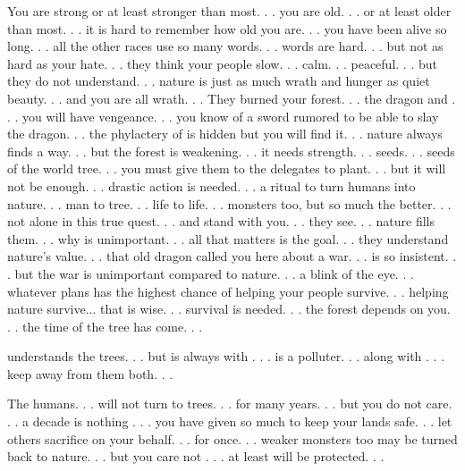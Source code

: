 \documentclass[char]{guildcamp2}
\begin{document}
\name{\cEnt{}}




You are strong or at least stronger than most. . . you are old. . . or at least older than most. . . it is hard to remember how old you are. . . you have been alive so long. . . all the other races use so many words. . . words are hard. . . but not as hard as your hate. . . they think your people slow. . . calm. . . peaceful. . . but they do not understand. . . nature is just as much wrath and hunger as quiet beauty. . . and you are all wrath. . . They burned your forest. . . \cRed{} the dragon and \cLich{}. . . you will have vengeance. . . you know of a sword rumored to be able to slay the dragon. . . the phylactery of \cLich{} is hidden but you will find it. . . nature always finds a way. . .  but the forest is weakening. . . it needs strength. . . seeds. . . seeds of the world tree. . . you must give them to the delegates to plant. . . but it will not be enough. . . drastic action is needed. . . a ritual to turn humans into nature. . . man to tree. . . life to life. . . monsters too, but so much the better. . . not alone in this true quest. . . \cTreeFae{} and \cTroll{} stand with you. . . they see. . . nature fills them. . . why is unimportant. . . all that matters is the goal. . . they understand nature's value. . . that old dragon called you here about a war. . . \cOnyx{} is so insistent. . . but the war is unimportant compared to nature. . . a blink of the eye. . . whatever plans has the highest chance of helping your people survive. . . helping nature survive... that is wise. . . survival is needed. . . the forest depends on you. . . the time of the tree has come. . .

\cTreeFae{} understands the trees. . . but \cTreeFae{\they} is always with \cBabyFae{} . . . \cBabyFae{} is a polluter. . . along with \cBasilisk{} . . . keep \cTreeFae{} away from them both. . .

The humans. . . will not turn to trees. . . for many years. . . but you do not care. . . a decade is nothing . . . you have given so much to keep your lands safe. . . let others sacrifice on your behalf. . . for once. . . weaker monsters too may be turned back to nature. . . but you care not . . . \cTreeFae{} at least will be protected. . .
\end{document}
